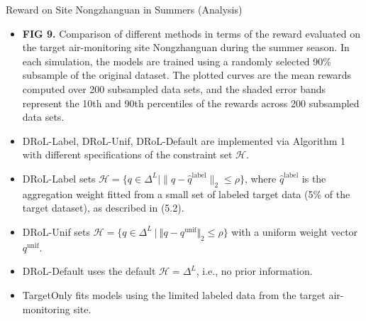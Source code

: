 \documentclass{beamer}
\begin{document}
\begin{frame}{Reward on Site Nongzhanguan in Summers (Analysis)}
    \begin{itemize}
        \item \textbf{FIG 9.} Comparison of different methods in terms of the reward evaluated on the target air-monitoring site Nongzhanguan during the summer season. In each simulation, the models are trained using a randomly selected 90\% subsample of the original dataset. The plotted curves are the mean rewards computed over 200 subsampled data sets, and the shaded error bands represent the 10th and 90th percentiles of the rewards across 200 subsampled data sets.
        \item DRoL-Label, DRoL-Unif, DRoL-Default are implemented via Algorithm 1 with different specifications of the constraint set $\mathcal{H}$.
        \item DRoL-Label sets $\mathcal{H} = \{ q \in \Delta^{L} \mid \| q - \widehat{q}^{\mathrm{label}} \|_{2} \leq \rho \}$, where $\widehat{q}^{\mathrm{label}}$ is the aggregation weight fitted from a small set of labeled target data (5\% of the target dataset), as described in (5.2).
        \item DRoL-Unif sets $\mathcal{H} = \{ q \in \Delta^{L} \ | \ \Vert q - q^{\mathrm{unif}} \Vert_{2} \leq \rho \}$ with a uniform weight vector $q^{\mathrm{unif}}$.
        \item DRoL-Default uses the default $\mathcal{H} = \Delta^{L}$, i.e., no prior information.
        \item TargetOnly fits models using the limited labeled data from the target air-monitoring site.
    \end{itemize}
\end{frame}
\end{document}
